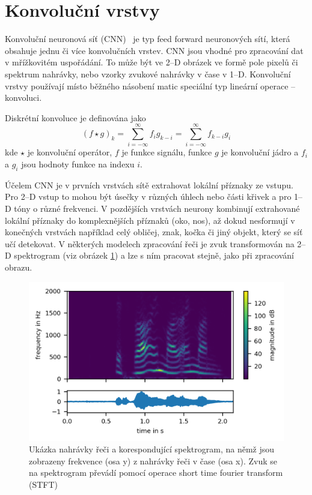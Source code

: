\section{Konvoluční vrstvy}
Konvoluční neuronová síť (CNN)~\cite{6795724} je typ feed forward neuronových sítí, která obsahuje jednu či více konvolučních vrstev. CNN jsou vhodné pro zpracování dat v mřížkovitém uspořádání. To může být ve 2--D obrázek ve formě pole pixelů či spektrum nahrávky, nebo vzorky zvukové nahrávky v čase v 1--D. Konvoluční vrstvy používají místo běžného násobení matic speciální typ lineární operace -- konvoluci.

Diskrétní konvoluce je definována jako
\begin{equation}
   (f \star g)_k = \sum_{i=-\infty}^{\infty} f_i g_{k-i} = \sum_{i=-\infty}^{\infty} f_{k-i} g_{i}
\end{equation}
kde $\star$ je konvoluční operátor, $f$ je funkce signálu, funkce $g$ je konvoluční jádro a $f_i$ a $g_i$ jsou hodnoty funkce na indexu $i$.


Účelem CNN je v prvních vrstvách sítě extrahovat lokální příznaky ze vstupu. Pro 2--D vstup to mohou být úsečky v různých úhlech nebo části křivek a pro 1--D tóny o různé frekvenci. V pozdějších vrstvách neurony kombinují extrahované lokální příznaky do komplexnějších příznaků (oko, nos), až dokud nesformují v konečných vrstvách například celý obličej, znak, kočka či jiný objekt, který se síť učí detekovat. V některých modelech zpracování řeči je zvuk transformován na 2--D spektrogram (viz obrázek \ref{fig:spektrogram}) a lze s ním pracovat stejně, jako při zpracování obrazu. 


\begin{figure}[H]
    \centering
    \includegraphics[scale=1.0]{obrazky-figures/spektrum.png}
    \caption{\label{fig:spektrogram}Ukázka nahrávky řeči a korespondující spektrogram, na němž jsou zobrazeny frekvence (osa y) z nahrávky řeči v čase (osa x). Zvuk se na spektrogram převádí pomocí operace short time fourier transform (STFT)}
\end{figure}

